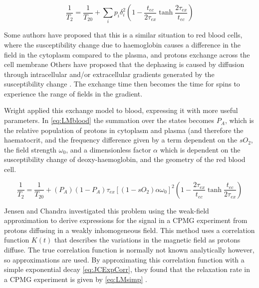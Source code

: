\begin{equation}
\label{eq:LMchemEx}
\frac{1}{T_2} = \frac{1}{T_{20}} + \sum_i{p_i\delta_i^2} \left(1 - \frac{t_{ec}}{2\tau_{ex}} \tanh{ \frac{2\tau_{ex}}{t_{ec}} }\right)
\end{equation}

Some authors have proposed that this is a similar situation to red blood cells, where the susceptibility change due to haemoglobin causes a difference in the field in the cytoplasm compared to the plasma, and protons exchange across the cell membrane\cite{BryantMagneticrelaxationblood1990}
Others have proposed that the dephasing is caused by diffusion through intracellular and/or extracellular gradients generated by the susceptibility change \cite{GomoriNMRRelaxationTimes1987,BrooksComparisont2relaxation1995,BrooksT2shorteningweaklymagnetized2001}.
The exchange time then becomes the time for spins to experience the range of fields in the gradient.

Wright\cite{WrightEstimatingoxygensaturation1991} applied this exchange model to blood, expressing it with more useful parameters.
In \autoref{eq:LMblood} the summation over the states becomes $P_A$, which is the relative population of protons in cytoplasm and plasma (and therefore the haematocrit, and the frequency difference given by a term dependent on the $sO_2$, the field strength $\omega_0$, and a dimensionless factor $\alpha$ which is dependent on the susceptibility change of deoxy-haemoglobin, and the geometry of the red blood cell.

\begin{equation}
\label{eq:LMblood}
\frac{1}{T_2} = \frac{1}{T_{20}} + (P_A)(1 - P_A)\tau_{ex} \left[(1-sO_2)\alpha\omega_0\right]^2 \left(1 - \frac{2\tau_{ex}}{t_{ec}} \tanh{\frac{t_{ec}}{2\tau_{ex}} } \right)
\end{equation}

Jensen and Chandra investigated this problem using the weak-field approximation to derive expressions for the signal in a CPMG experiment from protons diffusing in a weakly inhomogeneous field\cite{JensenNMRrelaxationtissues2000}.
This method uses a correlation function $K(t)$ that describes the variations in the magnetic field as protons diffuse.
The true correlation function is normally not known analytically however, so approximations are used.
By approximating this correlation function with a simple exponential decay \autoref{eq:JCExpCorr}, they found that the relaxation rate in a CPMG experiment is given by \autoref{eq:LMsimp} \cite{JensenNMRrelaxationtissues2000}.

